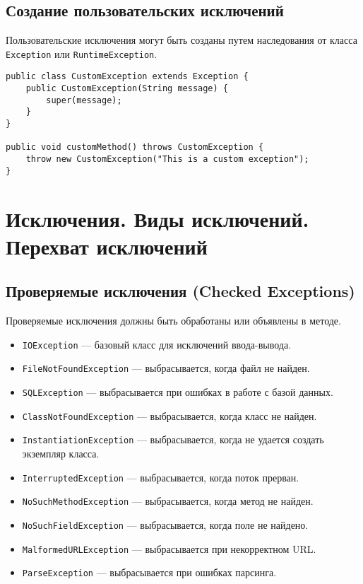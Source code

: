 \documentclass[12pt, a4paper]{article}
\begin{document}
\subsection*{Создание пользовательских исключений}
Пользовательские исключения могут быть созданы путем наследования от класса \texttt{Exception} или \texttt{RuntimeException}.

\begin{verbatim}
public class CustomException extends Exception {
    public CustomException(String message) {
        super(message);
    }
}

public void customMethod() throws CustomException {
    throw new CustomException("This is a custom exception");
}
\end{verbatim}


\section{Исключения. Виды исключений. Перехват исключений}
\subsection*{Проверяемые исключения (Checked Exceptions)}
Проверяемые исключения должны быть обработаны или объявлены в методе.
\begin{itemize}
    \item \texttt{IOException} — базовый класс для исключений ввода-вывода.
    \item \texttt{FileNotFoundException} — выбрасывается, когда файл не найден.
    \item \texttt{SQLException} — выбрасывается при ошибках в работе с базой данных.
    \item \texttt{ClassNotFoundException} — выбрасывается, когда класс не найден.
    \item \texttt{InstantiationException} — выбрасывается, когда не удается создать экземпляр класса.
    \item \texttt{InterruptedException} — выбрасывается, когда поток прерван.
    \item \texttt{NoSuchMethodException} — выбрасывается, когда метод не найден.
    \item \texttt{NoSuchFieldException} — выбрасывается, когда поле не найдено.
    \item \texttt{MalformedURLException} — выбрасывается при некорректном URL.
    \item \texttt{ParseException} — выбрасывается при ошибках парсинга.
\end{itemize}
\end{document}
